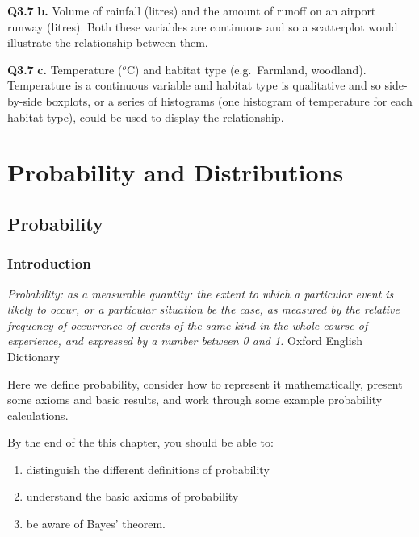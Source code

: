 \documentclass[
  oneside]{krantz}
\providecommand{\tightlist}{%
  \setlength{\itemsep}{0pt}\setlength{\parskip}{0pt}}
\begin{document}
\textbf{Q3.7} \textbf{b.} Volume of rainfall (litres) and the amount of runoff on an airport runway (litres). Both these variables are continuous and so a scatterplot would illustrate the relationship between them.

\textbf{Q3.7} \textbf{c.} Temperature (\(^o\)C) and habitat type (e.g.~Farmland, woodland). Temperature is a continuous variable and habitat type is qualitative and so side-by-side boxplots, or a series of histograms (one histogram of temperature for each habitat type), could be used to display the relationship.

\hypertarget{part-probability-and-distributions}{%
\part{Probability and Distributions}\label{part-probability-and-distributions}}

\hypertarget{probability}{%
\chapter{Probability}\label{probability}}

\hypertarget{INTprob}{%
\section{Introduction}\label{INTprob}}

{ \emph{Probability: as a measurable quantity: the extent to which a particular event is likely to occur, or a particular situation be the case, as measured by the relative frequency of occurrence of events of the same kind in the whole course of experience, and expressed by a number between 0 and 1.}
Oxford English Dictionary \citeyearpar{dictionary1989oxford}}

Here we define probability, consider how to represent it mathematically, present some axioms and basic results, and work through some example probability calculations.

By the end of the this chapter, you should be able to:

\begin{enumerate}
\def\labelenumi{\arabic{enumi}.}
\tightlist
\item
  distinguish the different definitions of probability
\item
  understand the basic axioms of probability
\item
  be aware of Bayes' theorem.
\end{enumerate}
\end{document}
